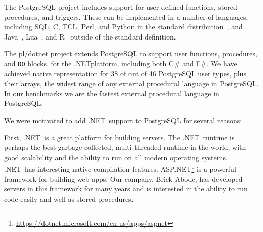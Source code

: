 \documentclass[sigconf,techreport,authorversion,nonacm]{acmart}
\newcommand{\dotnet}{.NET}
\begin{document}
The PostgreSQL project includes support for user-defined functions, stored procedures, and triggers.
These can be implemented in a number of languages, including SQL, C, TCL, Perl, and Python in the standard distribution~\cite{PostgreSQL2022}, and Java~\cite{PLJava}, Lua~\cite{PLLua}, and R~\cite{PLR} outside of the standard definition.


The pl/dotnet project extends PostgreSQL to support user functions,
procedures, and \texttt{DO} blocks.  for the \dotnet platform,
including both C\# and F\#.  We have achieved native representation
for 38 of out of 46 PostgreSQL user types, plus their arrays, the
widest range of any external procedural language in PostgreSQL. In
our benchmarks we are the fastest external procedural language in
PostgreSQL.


We were motivated to add \dotnet\ support to PostgreSQL for several
reasons:

First, \dotnet\ is a great platform for building servers. The \dotnet\
runtime is perhaps the best garbage-collected, multi-threaded runtime
in the world, with good scalability and the ability to run on all
modern operating systems. \dotnet\ has interesting native compilation
features. ASP.NET\footnote{\url{https://dotnet.microsoft.com/en-us/apps/aspnet}}
is a powerful framework for building web apps. Our company, Brick
Abode, has developed servers in this framework for many years and
is interested in the ability to run code easily and well as stored
procedures.
\end{document}
